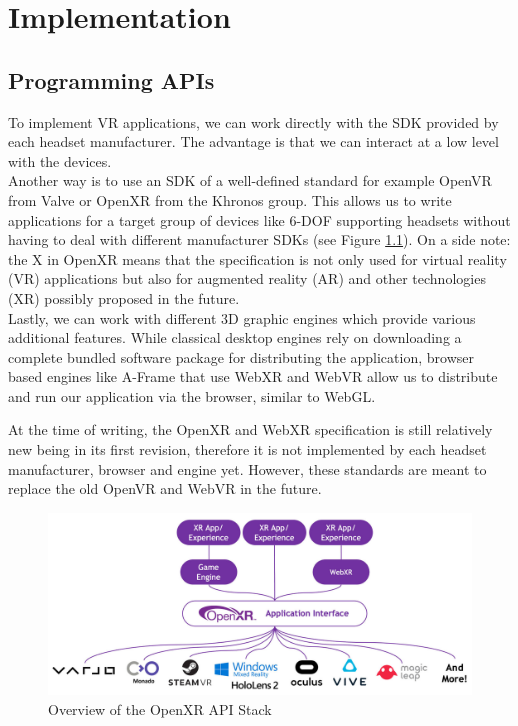 \chapter{Implementation}
\label{chap:Impl}
\section{Programming APIs}

To implement VR applications, we can work directly with the SDK provided by each headset manufacturer. The advantage is that we can interact at a low level with the devices.\\ 
Another way is to use an SDK of a well-defined standard for example OpenVR from Valve or OpenXR from the Khronos group. This allows us to write applications for a target group of devices like 6-DOF supporting headsets without having to deal with different manufacturer SDKs (see Figure \ref{fig:openxr-overview}). On a side note: the X in OpenXR means that the specification is not only used for virtual reality (VR) applications but also for augmented reality (AR) and other technologies (XR) possibly proposed in the future.\\
Lastly, we can work with different 3D graphic engines which provide various additional features. While classical desktop engines rely on downloading a complete bundled software package for distributing the application, browser based engines like A-Frame that use WebXR and WebVR allow us to distribute and run our application via the browser, similar to WebGL.

At the time of writing, the OpenXR and WebXR specification is still relatively new being in its first revision, therefore it is not implemented by each headset manufacturer, browser and engine yet. However, these standards are meant to replace the old OpenVR and WebVR in the future.

\begin{figure}[!hbt]
    \centering
    \includegraphics[width=\textwidth]{graphics/openXR-overview.jpg}
    \caption{Overview of the OpenXR API Stack \cite{khronosGroupOpenXR}}
    \label{fig:openxr-overview}
\end{figure}


